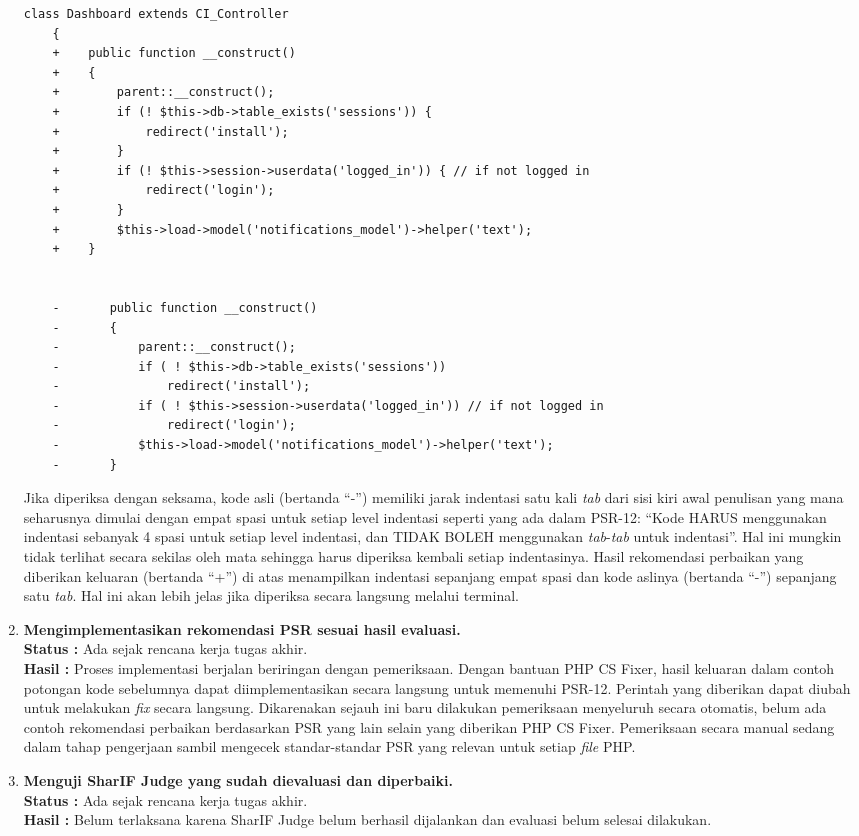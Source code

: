 \documentclass[a4paper,twoside]{article}
\begin{document}
\begin{enumerate}
\begin{lstlisting}[frame=single,language=diff]
	class Dashboard extends CI_Controller
	{
	+    public function __construct()
	+    {
	+        parent::__construct();
	+        if (! $this->db->table_exists('sessions')) {
	+            redirect('install');
	+        }
	+        if (! $this->session->userdata('logged_in')) { // if not logged in
	+            redirect('login');
	+        }
	+        $this->load->model('notifications_model')->helper('text');
	+    }
		
		
	-		public function __construct()
	-		{
	-			parent::__construct();
	-			if ( ! $this->db->table_exists('sessions'))
	-				redirect('install');
	-			if ( ! $this->session->userdata('logged_in')) // if not logged in
	-				redirect('login');
	-			$this->load->model('notifications_model')->helper('text');
	-		}
\end{lstlisting}
			Jika diperiksa dengan seksama, kode asli (bertanda ``-'') memiliki jarak indentasi satu kali \textit{tab} dari sisi kiri awal penulisan yang mana seharusnya dimulai dengan empat spasi untuk setiap level indentasi seperti yang ada dalam PSR-12: ``Kode HARUS menggunakan indentasi sebanyak 4 spasi untuk setiap level indentasi, dan TIDAK BOLEH menggunakan \textit{tab}-\textit{tab} untuk indentasi''. Hal ini mungkin tidak terlihat secara sekilas oleh mata sehingga harus diperiksa kembali setiap indentasinya. Hasil rekomendasi perbaikan yang diberikan keluaran (bertanda ``+'') di atas menampilkan indentasi sepanjang empat spasi dan kode aslinya (bertanda ``-'') sepanjang satu \textit{tab}. Hal ini akan lebih jelas jika diperiksa secara langsung melalui terminal.   
			
			\item \textbf{Mengimplementasikan rekomendasi PSR sesuai hasil evaluasi.}\\
			{\bf Status :} Ada sejak rencana kerja tugas akhir.\\
			{\bf Hasil :} Proses implementasi berjalan beriringan dengan pemeriksaan. Dengan bantuan PHP CS Fixer, hasil keluaran dalam contoh potongan kode sebelumnya dapat diimplementasikan secara langsung untuk memenuhi PSR-12. Perintah yang diberikan dapat diubah untuk melakukan \textit{fix} secara langsung. Dikarenakan sejauh ini baru dilakukan pemeriksaan menyeluruh secara otomatis, belum ada contoh rekomendasi perbaikan berdasarkan PSR yang lain selain yang diberikan PHP CS Fixer. Pemeriksaan secara manual sedang dalam tahap pengerjaan sambil mengecek standar-standar PSR yang relevan untuk setiap \textit{file} PHP.
			
			\item \textbf{Menguji SharIF Judge yang sudah dievaluasi dan diperbaiki.}\\
			{\bf Status :} Ada sejak rencana kerja tugas akhir.\\
			{\bf Hasil :} Belum terlaksana karena SharIF Judge belum berhasil dijalankan dan evaluasi belum selesai dilakukan. 
			

\end{enumerate}
\end{document}
